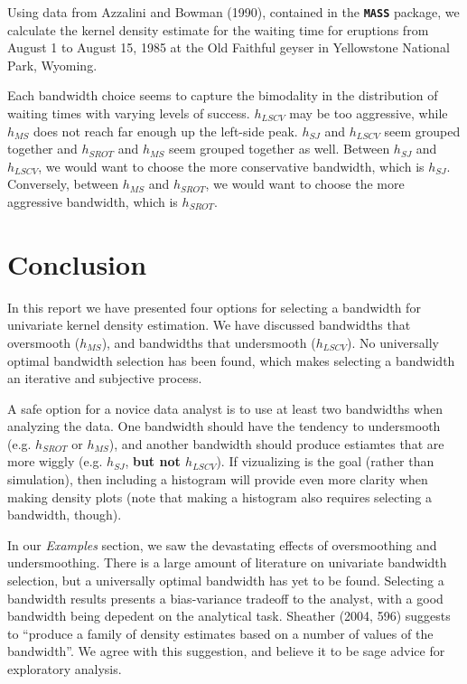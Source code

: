 \documentclass[]{article}
\begin{document}
Using data from Azzalini and Bowman (1990), contained in the
\textbf{\texttt{MASS}} package, we calculate the kernel density estimate
for the waiting time for eruptions from August 1 to August 15, 1985 at
the Old Faithful geyser in Yellowstone National Park, Wyoming.

Each bandwidth choice seems to capture the bimodality in the
distribution of waiting times with varying levels of success.
\(h_{LSCV}\) may be too aggressive, while \(h_{MS}\) does not reach far
enough up the left-side peak. \(h_{SJ}\) and \(h_{LSCV}\) seem grouped
together and \(h_{SROT}\) and \(h_{MS}\) seem grouped together as well.
Between \(h_{SJ}\) and \(h_{LSCV}\), we would want to choose the more
conservative bandwidth, which is \(h_{SJ}\). Conversely, between
\(h_{MS}\) and \(h_{SROT}\), we would want to choose the more aggressive
bandwidth, which is \(h_{SROT}\).

\section{Conclusion}\label{conclusion}

In this report we have presented four options for selecting a bandwidth
for univariate kernel density estimation. We have discussed bandwidths
that oversmooth (\(h_{MS}\)), and bandwidths that undersmooth
(\(h_{LSCV}\)). No universally optimal bandwidth selection has been
found, which makes selecting a bandwidth an iterative and subjective
process.

A safe option for a novice data analyst is to use at least two
bandwidths when analyzing the data. One bandwidth should have the
tendency to undersmooth (e.g. \(h_{SROT}\) or \(h_{MS}\)), and another
bandwidth should produce estiamtes that are more wiggly (e.g.
\(h_{SJ}\), \textbf{but not \(h_{LSCV}\)}). If vizualizing is the goal
(rather than simulation), then including a histogram will provide even
more clarity when making density plots (note that making a histogram
also requires selecting a bandwidth, though).

In our \emph{Examples} section, we saw the devastating effects of
oversmoothing and undersmoothing. There is a large amount of literature
on univariate bandwidth selection, but a universally optimal bandwidth
has yet to be found. Selecting a bandwidth results presents a
bias-variance tradeoff to the analyst, with a good bandwidth being
depedent on the analytical task. Sheather (2004, 596) suggests to
``produce a family of density estimates based on a number of values of
the bandwidth''. We agree with this suggestion, and believe it to be
sage advice for exploratory analysis.
\end{document}
